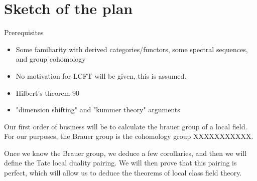 
\section{Sketch of the plan}

Prerequisites
\begin{itemize}
	\item Some familiarity with derived categories/functors,
		some spectral sequences, and group cohomology
	\item No motivation for LCFT will be given, this is assumed.
	\item Hilbert's theorem 90
	\item "dimension shifting" and "kummer theory" arguments
\end{itemize}


Our first order of business will be to calculate
the brauer group of a local field.
For our purposes, the Brauer group is the 
cohomology group XXXXXXXXXXX.


Once we know the Brauer group, we deduce a few corollaries,
and then we will define the Tate local duality pairing.
We will then prove that this pairing is perfect,
which will allow us to deduce the theorems of
local class field theory.


